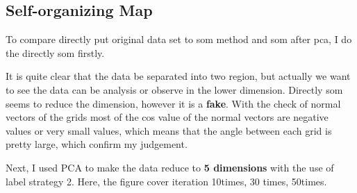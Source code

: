 \documentclass[titlepage,a4paper,12pt,thmsb]{report}
\begin{document}
\subsection{Self-organizing Map}

To compare directly put original data set to som method and som after pca, I do the directly som firstly.

It is quite clear that the data be separated into two region, but actually we want to see the data can be analysis or observe in the lower dimension.  Directly som seems to reduce the dimension, however it is a {\bf fake}.  With the check of  normal vectors of the grids most of the cos value of the normal vectors are negative values or very small values, which means that the angle between each grid is pretty large, which confirm my judgement.


\begin{center}
\begin{figure}[h]
{\par}
\end{figure}
{}
\end{center}

\newpage

Next, I used PCA to make the data reduce to {\bf 5 dimensions} with the use of  label strategy 2. Here, the figure cover iteration 10times, 30 times, 50times.
\end{document}
